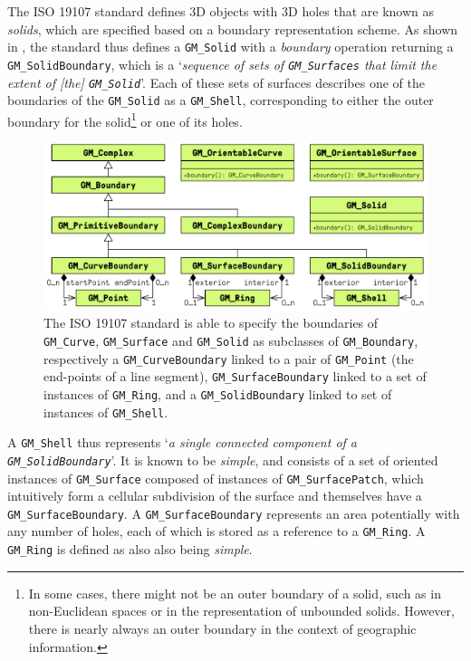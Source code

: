 The ISO 19107 standard \citep[\S{}6.3.18]{ISO19107:2005} defines 3D objects with 3D holes that are known as \emph{solids}, which are specified based on a boundary representation scheme.
As shown in , the standard thus defines a \texttt{GM\_Solid} with a \emph{boundary} operation returning a \texttt{GM\_SolidBoundary}, which is a `\emph{sequence of sets of \texttt{GM\_Surfaces} that limit the extent of [the] \texttt{GM\_Solid}}'.
Each of these sets of surfaces describes one of the boundaries of the \texttt{GM\_Solid} as a \texttt{GM\_Shell}, corresponding to either the outer boundary for the solid\footnote{In some cases, there might not be an outer boundary of a solid, such as in non-Euclidean spaces or in the representation of unbounded solids. However, there is nearly always an outer boundary in the context of geographic information.} or one of its holes.

\begin{figure}[tbp]
\centering
\includegraphics[width=\linewidth]{figs/iso-brep}
\caption[The boundary representation scheme in ISO 19107]{The ISO 19107 standard \citep[\S{}6.3.2]{ISO19107:2005} is able to specify the boundaries of \texttt{GM\_Curve}, \texttt{GM\_Surface} and \texttt{GM\_Solid} as subclasses of \texttt{GM\_Boundary}, respectively a \texttt{GM\_CurveBoundary} linked to a pair of \texttt{GM\_Point} (the end-points of a line segment), \texttt{GM\_SurfaceBoundary} linked to a set of instances of \texttt{GM\_Ring}, and a \texttt{GM\_SolidBoundary} linked to set of instances of \texttt{GM\_Shell}.}
\label{fig:iso-brep}
\end{figure}

A \texttt{GM\_Shell} \citep[\S{}6.3.8]{ISO19107:2005} thus represents `\emph{a single connected component of a \texttt{GM\_SolidBoundary}}'.
It is known to be \emph{simple}, and consists of a set of oriented instances of \texttt{GM\_Surface} composed of instances of \texttt{GM\_SurfacePatch}, which intuitively form a cellular subdivision of the surface and themselves have a \texttt{GM\_SurfaceBoundary}.
A \texttt{GM\_SurfaceBoundary} represents an area potentially with any number of holes, each of which is stored as a reference to a \texttt{GM\_Ring}.
A \texttt{GM\_Ring} \citep[\S{}6.3.6]{ISO19107:2005} is defined as also also being \emph{simple}.


